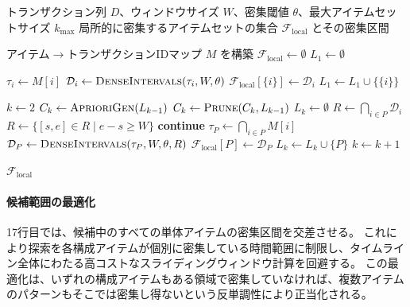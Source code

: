 \begin{algorithm}[t]
\caption{第1段階：密集区間発見}
\label{alg:phase1}
\begin{algorithmic}[1]
\REQUIRE トランザクション列 $D$、ウィンドウサイズ $W$、密集閾値 $\theta$、最大アイテムセットサイズ $k_{\max}$
\ENSURE 局所的に密集するアイテムセットの集合 $\mathcal{F}_{\text{local}}$ とその密集区間

\STATE アイテム$\to$トランザクションIDマップ $M$ を構築
\STATE $\mathcal{F}_{\text{local}} \gets \emptyset$
\STATE $L_1 \gets \emptyset$ 

    \STATE $\tau_i \gets M[i]$ 
    \STATE $\mathcal{D}_i \gets \textsc{DenseIntervals}(\tau_i, W, \theta)$
        \STATE $\mathcal{F}_{\text{local}}[\{i\}] \gets \mathcal{D}_i$
        \STATE $L_1 \gets L_1 \cup \{\{i\}\}$
    \ENDIF
\ENDFOR

\STATE $k \gets 2$
    \STATE $C_k \gets \textsc{AprioriGen}(L_{k-1})$
    \STATE $C_k \gets \textsc{Prune}(C_k, L_{k-1})$
    \STATE $L_k \gets \emptyset$
        \STATE $R \gets \bigcap_{i \in P} \mathcal{D}_i$ 
        \STATE $R \gets \{[s,e] \in R \mid e - s \geq W\}$
            \STATE \textbf{continue} 
        \ENDIF
        \STATE $\tau_P \gets \bigcap_{i \in P} M[i]$ 
        \STATE $\mathcal{D}_P \gets \textsc{DenseIntervals}(\tau_P, W, \theta, R)$
            \STATE $\mathcal{F}_{\text{local}}[P] \gets \mathcal{D}_P$
            \STATE $L_k \gets L_k \cup \{P\}$
        \ENDIF
    \ENDFOR
    \STATE $k \gets k + 1$
\ENDWHILE

\RETURN $\mathcal{F}_{\text{local}}$
\end{algorithmic}
\end{algorithm}

\paragraph{候補範囲の最適化}
17行目では、候補中のすべての単体アイテムの密集区間を交差させる。
これにより探索を各構成アイテムが個別に密集している時間範囲に制限し、タイムライン全体にわたる高コストなスライディングウィンドウ計算を回避する。
この最適化は、いずれの構成アイテムもある領域で密集していなければ、複数アイテムのパターンもそこでは密集し得ないという反単調性により正当化される。

